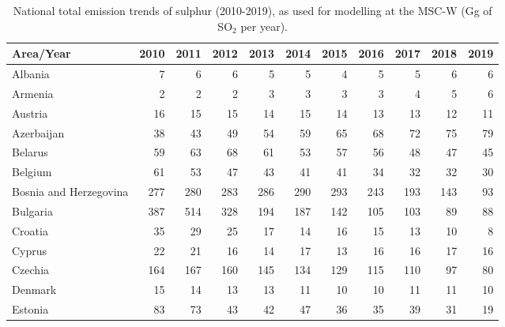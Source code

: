  \begin{table}
 \caption{National total emission trends of sulphur (2010-2019), as used for modelling at the MSC-W (Gg of SO$_2$ per year).}
 
 \vspace{15pt}
 
 \scriptsize
 \centering
 \begin{tabular}{|l|r|r|r|r|r|r|r|r|r|r|}
 \hline
                     Area/Year&   2010&   2011&   2012&   2013&   2014&   2015&   2016&   2017&   2018&   2019\\\hline\hline
                       Albania&      7&      6&      6&      5&      5&      4&      5&      5&      6&      6\\\hline
                       Armenia&      2&      2&      2&      3&      3&      3&      3&      4&      5&      6\\\hline
                       Austria&     16&     15&     15&     14&     15&     14&     13&     13&     12&     11\\\hline
                    Azerbaijan&     38&     43&     49&     54&     59&     65&     68&     72&     75&     79\\\hline
                       Belarus&     59&     63&     68&     61&     53&     57&     56&     48&     47&     45\\\hline
                       Belgium&     61&     53&     47&     43&     41&     41&     34&     32&     32&     30\\\hline
        Bosnia and Herzegovina&    277&    280&    283&    286&    290&    293&    243&    193&    143&     93\\\hline
                      Bulgaria&    387&    514&    328&    194&    187&    142&    105&    103&     89&     88\\\hline
                       Croatia&     35&     29&     25&     17&     14&     16&     15&     13&     10&      8\\\hline
                        Cyprus&     22&     21&     16&     14&     17&     13&     16&     16&     17&     16\\\hline
                       Czechia&    164&    167&    160&    145&    134&    129&    115&    110&     97&     80\\\hline
                       Denmark&     15&     14&     13&     13&     11&     10&     10&     11&     11&     10\\\hline
                       Estonia&     83&     73&     43&     42&     47&     36&     35&     39&     31&     19\\\hline

\end{tabular}
\end{table}
